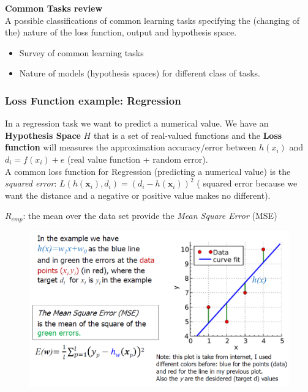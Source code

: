 \documentclass[../main.tex]{subfiles}
\begin{document}
\noindent\textbf{Common Tasks review}\\
A possible classifications of common learning tasks specifying the (changing of the) nature of the loss function, output and hypothesis space.
\begin{itemize}
    \item Survey of common learning tasks
    \item Nature of models (hypothesis spaces) for different class of tasks.
\end{itemize}

\subsubsection{Loss Function example: Regression}
In a regression task we want to predict a numerical value. We have an \textbf{Hypothesis Space} $H$ that is a set of real-valued functions and the \textbf{Loss function} will measures the approximation accuracy/error between $h(x_i)$ and $d_i = f(x_i) + e$ (real value function + random error).\\

A common loss function for Regression (predicting a numerical value) is the \emph{squared error}: $L(h(\textbf{x}_{i}),d_{i}) = (d_{i} - h(\textbf{x}_{i}))^{2}$ ( squared error because we want the distance and a negative or positive value makes no different).
\begin{center}
    $R_{emp}$: the mean over the data set provide the \emph{Mean Square Error} (MSE)
\end{center}
\begin{figure}[H]
    \centering
    \includegraphics[scale=0.4]{lectures/1_Introduction/mse.png}
\end{figure}
\end{document}
